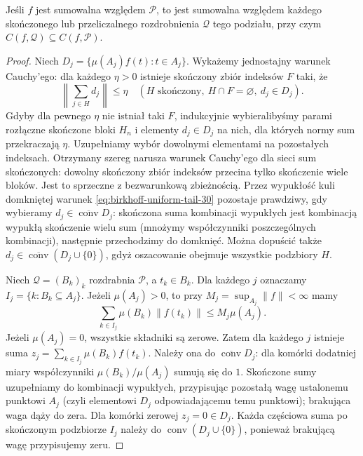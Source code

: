 \begin{lemat}
\label{lem:birkhoff-refinement-30}
Jeśli $f$ jest sumowalna względem $\mathcal P$,
to jest sumowalna względem każdego skończonego
lub przeliczalnego rozdrobnienia $\mathcal Q$ tego podziału, przy czym
$C(f,\mathcal Q)\subseteq C(f,\mathcal P)$.
\end{lemat}
\begin{proof}
Niech $D_j=\{\mu(A_j)f(t):t\in A_j\}$.
Wykażemy jednostajny warunek Cauchy'ego:
dla każdego $\eta>0$ istnieje skończony zbiór
indeksów $F$ taki, że
\begin{equation}\label{eq:birkhoff-uniform-tail-30}
 \left\|\sum_{j\in H}d_j\right\|\le\eta
 \quad(H\text{ skończony},\ H\cap F=\varnothing,\ d_j\in D_j).
\end{equation}
Gdyby dla pewnego $\eta$ nie istniał taki $F$,
indukcyjnie wybieralibyśmy parami rozłączne skończone
bloki $H_n$ i elementy $d_j\in D_j$ na nich,
dla których normy sum przekraczają $\eta$.
Uzupełniamy wybór dowolnymi elementami na pozostałych
indeksach. Otrzymany szereg narusza warunek Cauchy'ego
dla sieci sum skończonych: dowolny skończony zbiór
indeksów przecina tylko skończenie wiele bloków.
Jest to sprzeczne z bezwarunkową zbieżnością.
Przez wypukłość kuli domkniętej warunek
\eqref{eq:birkhoff-uniform-tail-30} pozostaje prawdziwy,
gdy wybieramy $d_j\in\overline{\operatorname{conv}}D_j$:
skończona suma kombinacji wypukłych jest kombinacją
wypukłą skończenie wielu sum (mnożymy współczynniki
poszczególnych kombinacji), następnie przechodzimy
do domknięć. Można dopuścić także
$d_j\in\overline{\operatorname{conv}}(D_j\cup\{0\})$,
gdyż oszacowanie obejmuje wszystkie podzbiory $H$.

Niech $\mathcal Q=(B_k)_k$ rozdrabnia $\mathcal P$,
a $t_k\in B_k$. Dla każdego $j$ oznaczamy
$I_j=\{k:B_k\subseteq A_j\}$. Jeżeli $\mu(A_j)>0$,
to przy $M_j=\sup_{A_j}\|f\|<\infty$ mamy
\[
 \sum_{k\in I_j}\mu(B_k)\|f(t_k)\|\le M_j\mu(A_j).
\]
Jeżeli $\mu(A_j)=0$, wszystkie składniki są zerowe.
Zatem dla każdego $j$ istnieje suma
$z_j=\sum_{k\in I_j}\mu(B_k)f(t_k)$.
Należy ona do $\overline{\operatorname{conv}}D_j$:
dla komórki dodatniej miary współczynniki
$\mu(B_k)/\mu(A_j)$ sumują się do $1$.
Skończone sumy uzupełniamy do kombinacji wypukłych,
przypisując pozostałą wagę ustalonemu punktowi
$A_j$ (czyli elementowi $D_j$ odpowiadającemu temu
punktowi); brakująca waga dąży do zera.
Dla komórki zerowej $z_j=0\in D_j$.
Każda częściowa suma po skończonym podzbiorze
$I_j$ należy do $\operatorname{conv}(D_j\cup\{0\})$,
ponieważ brakującą wagę przypisujemy zeru.


\end{proof}
